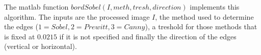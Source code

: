 The matlab function $bordSobel(I,meth,tresh,direction)$ implements this algorithm. The inputs are the processed image $I$, the method used to determine the edges ($1=Sobel, 2=Prewitt, 3=Canny$), a treshold for those methods that is fixed at $0.0215$ if it is not specified and finally the direction of the edges (vertical or horizontal).

